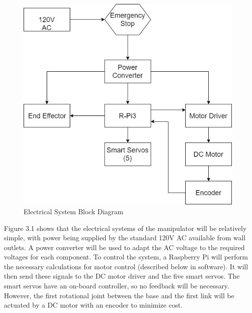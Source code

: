\documentclass[12pt]{report}
\begin{document}
\begin{figure}[h]
  \centering
  \includegraphics[width=.75\textwidth]{eblock}
  \caption{Electrical System Block Diagram}
  \label{fig:eblock}
\end{figure}
Figure 3.1 shows that the electrical systems of the manipulator will be relatively simple, with power being supplied by the standard 120V AC available from wall outlets. A power converter will be used to adapt the AC voltage to the required voltages for each component. To control the system, a Raspberry Pi will perform the necessary calculations for motor control (described below in software). It will then send these signals to the DC motor driver and the five smart servos. The smart servos have an on-board controller, so no feedback will be necessary. However, the first rotational joint between the base and the first link will be actuated by a DC motor with an encoder to minimize cost.


%
%

%
%   
\end{document}
